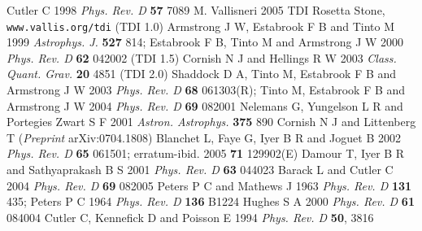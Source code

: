 \documentclass{iopart}
\begin{document}
\begin{thebibliography}{10}
%
 Cutler C 1998 \emph{Phys. Rev. D} \textbf{57} 7089
%
 M. Vallisneri 2005 TDI Rosetta Stone, \texttt{www.vallis.org/tdi}
 (TDI 1.0) Armstrong J W, Estabrook F B and Tinto M 1999
\emph{Astrophys. J.} \textbf{527} 814; Estabrook F B, Tinto M and Armstrong J W 2000 \emph{Phys. Rev. D} \textbf{62} 042002
 (TDI 1.5) Cornish N J and Hellings R W 2003 \emph{Class. Quant. Grav.} \textbf{20} 4851
 (TDI 2.0) Shaddock D A, Tinto M, Estabrook F B and Armstrong J W 2003 \emph{Phys. Rev. D} \textbf{68} 061303(R); Tinto M, Estabrook F B and Armstrong J W 2004 \emph{Phys. Rev. D} \textbf{69} 082001
 Nelemans G, Yungelson L R and Portegies Zwart S F 2001 \emph{Astron. Astrophys.} \textbf{375} 890
 Cornish N J and Littenberg T (\textit{Preprint} arXiv:0704.1808)
%
 Blanchet L, Faye G, Iyer B R and Joguet B 2002 \emph{Phys. Rev. D} \textbf{65} 061501; erratum-ibid. 2005 \textbf{71} 129902(E)
 Damour T, Iyer B R and Sathyaprakash B S 2001 \emph{Phys. Rev. D} \textbf{63} 044023
 Barack L and Cutler C 2004 \emph{Phys. Rev. D} {\bf 69} 082005
 Peters P C and Mathews J 1963 \emph{Phys. Rev. D} {\bf 131} 435; Peters P C 1964 \emph{Phys. Rev. D} {\bf 136} B1224
 Hughes S A 2000 \emph{Phys. Rev. D} {\bf 61} 084004
 Cutler C, Kennefick D and Poisson E 1994 \emph{Phys. Rev. D} {\bf 50}, 3816
%
\end{thebibliography}
\end{document}
